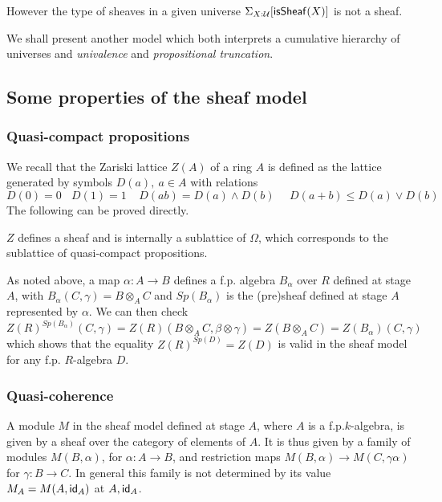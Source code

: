     \medskip

    However the type of sheaves in a given universe $\Sigma_{X:\mathcal{U}}[\mathsf{isSheaf}(X)]$ is not a sheaf.

    We shall present another model which both interprets a cumulative hierarchy of universes
    and {\em univalence} and {\em propositional truncation}.

    \subsection{Some properties of the sheaf model}

    \subsubsection{Quasi-compact propositions}

    We recall \cite{lombardi-quitte}
    that the Zariski lattice $Z(A)$ of a ring $A$ is defined as the lattice generated by symbols $D(a),~a\in A$
    with relations
    $$
    D(0) = 0~~~~D(1) = 1~~~~~D(ab) = D(a)\wedge D(b)~~~~~~D(a+b)\leqslant D(a)\vee D(b)
    $$
    The following can be proved directly.

    \begin{proposition}
      $Z$ defines a sheaf and is internally a sublattice of $\Omega$, which corresponds to the sublattice of quasi-compact
      propositions.
    \end{proposition}
    
    As noted above, a map $\alpha:A\rightarrow B$ defines a f.p. algebra $B_{\alpha}$ over $R$ defined at stage $A$, with
    $B_{\alpha}(C,\gamma) = B\otimes_A C$ and $Sp(B_{\alpha})$ is
    the (pre)sheaf defined at stage $A$ represented by $\alpha$.
    We can then check
    $$Z(R)^{Sp(B_{\alpha})}(C,\gamma) = Z(R)(B\otimes_A C,\beta\otimes\gamma) = Z(B\otimes_A C) = Z(B_{\alpha})(C,\gamma)$$
    which shows that the equality $Z(R)^{Sp(D)} = Z(D)$ is valid in the sheaf model for any f.p. $R$-algebra $D$.

    \subsubsection{Quasi-coherence}

A module $M$ in the sheaf model defined at stage $A$, where $A$ is a f.p.\@ $k$-algebra, is given by a sheaf over the category
of elements of $A$. It is thus given by a family of modules $M(B,\alpha)$, for $\alpha:A\rightarrow B$, and restriction maps
$M(B,\alpha)\rightarrow M(C,\gamma\alpha)$ for $\gamma:B\rightarrow C$. In general this family is not determined by
its value $M_A = M(A,\mathsf{id}_A)$ at $A,\mathsf{id}_A$.

